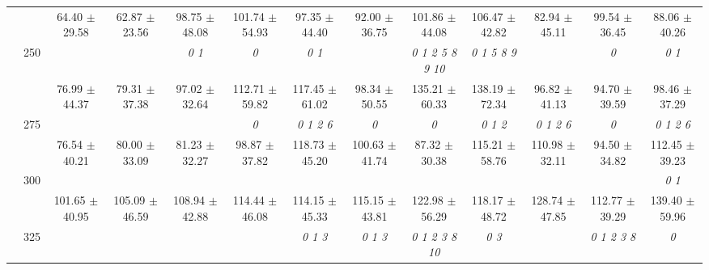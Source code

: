 \begin{table}[h]
{\begin{tabular}{
        ccccccccccccc}
 & & \cellcolor[HTML]{EFEFEF} 64.40 $\pm$ 29.58& \cellcolor[HTML]{EFEFEF} 62.87 $\pm$ 23.56& \cellcolor[HTML]{EFEFEF} 98.75 $\pm$ 48.08& \cellcolor[HTML]{EFEFEF} 101.74 $\pm$ 54.93& \cellcolor[HTML]{EFEFEF} 97.35 $\pm$ 44.40& \cellcolor[HTML]{EFEFEF} 92.00 $\pm$ 36.75& \cellcolor[HTML]{EFEFEF} 101.86 $\pm$ 44.08& \cellcolor[HTML]{EFEFEF} 106.47 $\pm$ 42.82& \cellcolor[HTML]{EFEFEF} 82.94 $\pm$ 45.11& \cellcolor[HTML]{EFEFEF} 99.54 $\pm$ 36.45& \cellcolor[HTML]{EFEFEF} 88.06 $\pm$ 40.26 \\ 
 & \multirow{2}{*}{250}& & & \textit{ 0 1 }& \textit{ 0 }& \textit{ 0 1 }& & \textit{  0  1  2  5  8  9 10 }& \textit{ 0 1 5 8 9 }& & \textit{ 0 }& \textit{ 0 1 } \\ 
 & & 76.99 $\pm$ 44.37& 79.31 $\pm$ 37.38& 97.02 $\pm$ 32.64& 112.71 $\pm$ 59.82& 117.45 $\pm$ 61.02& 98.34 $\pm$ 50.55& 135.21 $\pm$ 60.33& 138.19 $\pm$ 72.34& 96.82 $\pm$ 41.13& 94.70 $\pm$ 39.59& 98.46 $\pm$ 37.29 \\ 
 & \multirow{2}{*}{275}& \cellcolor[HTML]{EFEFEF} & \cellcolor[HTML]{EFEFEF} & \cellcolor[HTML]{EFEFEF} & \cellcolor[HTML]{EFEFEF} \textit{ 0 }& \cellcolor[HTML]{EFEFEF} \textit{ 0 1 2 6 }& \cellcolor[HTML]{EFEFEF} \textit{ 0 }& \cellcolor[HTML]{EFEFEF} \textit{ 0 }& \cellcolor[HTML]{EFEFEF} \textit{ 0 1 2 }& \cellcolor[HTML]{EFEFEF} \textit{ 0 1 2 6 }& \cellcolor[HTML]{EFEFEF} \textit{ 0 }& \cellcolor[HTML]{EFEFEF} \textit{ 0 1 2 6 } \\ 
 & & \cellcolor[HTML]{EFEFEF} 76.54 $\pm$ 40.21& \cellcolor[HTML]{EFEFEF} 80.00 $\pm$ 33.09& \cellcolor[HTML]{EFEFEF} 81.23 $\pm$ 32.27& \cellcolor[HTML]{EFEFEF} 98.87 $\pm$ 37.82& \cellcolor[HTML]{EFEFEF} 118.73 $\pm$ 45.20& \cellcolor[HTML]{EFEFEF} 100.63 $\pm$ 41.74& \cellcolor[HTML]{EFEFEF} 87.32 $\pm$ 30.38& \cellcolor[HTML]{EFEFEF} 115.21 $\pm$ 58.76& \cellcolor[HTML]{EFEFEF} 110.98 $\pm$ 32.11& \cellcolor[HTML]{EFEFEF} 94.50 $\pm$ 34.82& \cellcolor[HTML]{EFEFEF} 112.45 $\pm$ 39.23 \\ 
 & \multirow{2}{*}{300}& & & & & & & & & & & \textit{ 0 1 } \\ 
 & & 101.65 $\pm$ 40.95& 105.09 $\pm$ 46.59& 108.94 $\pm$ 42.88& 114.44 $\pm$ 46.08& 114.15 $\pm$ 45.33& 115.15 $\pm$ 43.81& 122.98 $\pm$ 56.29& 118.17 $\pm$ 48.72& 128.74 $\pm$ 47.85& 112.77 $\pm$ 39.29& 139.40 $\pm$ 59.96 \\ 
 & \multirow{2}{*}{325}& \cellcolor[HTML]{EFEFEF} & \cellcolor[HTML]{EFEFEF} & \cellcolor[HTML]{EFEFEF} & \cellcolor[HTML]{EFEFEF} & \cellcolor[HTML]{EFEFEF} \textit{ 0 1 3 }& \cellcolor[HTML]{EFEFEF} \textit{ 0 1 3 }& \cellcolor[HTML]{EFEFEF} \textit{  0  1  2  3  8 10 }& \cellcolor[HTML]{EFEFEF} \textit{ 0 3 }& \cellcolor[HTML]{EFEFEF} & \cellcolor[HTML]{EFEFEF} \textit{ 0 1 2 3 8 }& \cellcolor[HTML]{EFEFEF} \textit{ 0 } \\ 

\end{tabular}}
\end{table}
